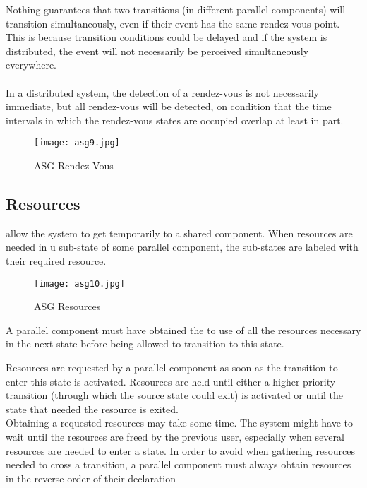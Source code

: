 \documentclass[../main.tex]{subfiles}
\begin{document}
Nothing guarantees that two transitions (in different parallel components) will transition simultaneously, even if their event has the same rendez-vous point.
This is because transition conditions could be delayed and if the system is distributed, the event will not necessarily be perceived simultaneously everywhere.
\\\\
In a distributed system, the detection of a rendez-vous is not necessarily immediate, but all rendez-vous will be detected, on condition that the time intervals in which the rendez-vous states are occupied overlap at least in part.
\begin{figure}[H]
    \centering
    \texttt{[image: asg9.jpg]}
    \caption{ASG Rendez-Vous}
    \label{asg9}
\end{figure}

\subsection{Resources}
 allow the system to get temporarily  to a shared component. When resources are needed in u sub-state of some parallel component, the sub-states are labeled with their required resource.


\begin{figure}[H]
    \centering
    \texttt{[image: asg10.jpg]}
    \caption{ASG Resources}
    \label{asg10}
\end{figure}
A parallel component must have obtained the  to use of all the resources necessary in the next state before being allowed to transition to this state.

Resources are requested by a parallel component as soon as the transition to enter this state is activated.
Resources are held until either a higher priority transition (through which the source state could exit) is activated or until the state that needed the resource is exited.
\\
Obtaining a requested resources may take some time.
The system might have to wait until the resources are freed by the previous user, especially when several resources are needed to enter a state.
In order to avoid  when gathering resources needed to cross a transition, a parallel component must always obtain resources in the reverse order of their declaration
\end{document}
